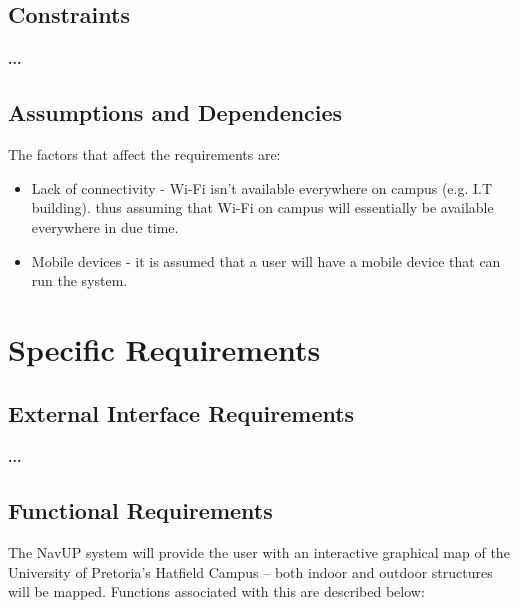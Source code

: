 \documentclass[runningheads,a4paper]{llncs}
\begin{document}
\subsection{Constraints}
\paragraph{...}

\subsection{Assumptions and Dependencies}
\let\labelitemi\labelitemii
The factors that affect the requirements are:
\begin{itemize}
	 
		\item Lack of connectivity -  Wi-Fi isn't available everywhere on campus (e.g. I.T building). thus assuming that Wi-Fi on campus will essentially be available everywhere in due time. \\
		
		\item Mobile devices - it is assumed that a user will have a mobile device that can run the system.
	 
\end{itemize}


\section{Specific Requirements}

\subsection{External Interface Requirements}
\paragraph{...}
\subsection{Functional Requirements}

\let\labelitemi\labelitemii
The NavUP system will provide the user with an interactive graphical map of the University of Pretoria's Hatfield Campus – both indoor and outdoor structures will be mapped. Functions associated with this are described below:
\end{document}
